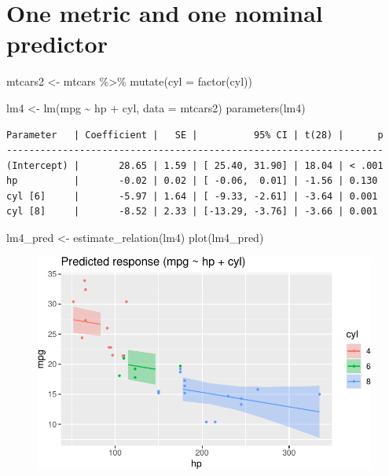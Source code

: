 \documentclass[
  letterpaper,
  DIV=11,
  numbers=noendperiod]{scrreprt}
\newenvironment{Shaded}{\begin{snugshade}}{\end{snugshade}}
\newcommand{\AttributeTok}[1]{\textcolor[rgb]{0.40,0.45,0.13}{#1}}
\newcommand{\FunctionTok}[1]{\textcolor[rgb]{0.28,0.35,0.67}{#1}}
\newcommand{\NormalTok}[1]{\textcolor[rgb]{0.00,0.23,0.31}{#1}}
\newcommand{\OtherTok}[1]{\textcolor[rgb]{0.00,0.23,0.31}{#1}}
\newcommand{\SpecialCharTok}[1]{\textcolor[rgb]{0.37,0.37,0.37}{#1}}
\theoremstyle{definition}
\theoremstyle{definition}
\theoremstyle{remark}
\begin{document}
\hypertarget{one-metric-and-one-nominal-predictor}{%
\section{One metric and one nominal
predictor}\label{one-metric-and-one-nominal-predictor}}

\begin{Shaded}
\begin{Highlighting}[]
\NormalTok{mtcars2 }\OtherTok{\textless{}{-}}
\NormalTok{  mtcars }\SpecialCharTok{\%\textgreater{}\%} 
  \FunctionTok{mutate}\NormalTok{(}\AttributeTok{cyl =} \FunctionTok{factor}\NormalTok{(cyl))}

\NormalTok{lm4 }\OtherTok{\textless{}{-}} \FunctionTok{lm}\NormalTok{(mpg }\SpecialCharTok{\textasciitilde{}}\NormalTok{ hp }\SpecialCharTok{+}\NormalTok{ cyl, }\AttributeTok{data =}\NormalTok{ mtcars2)}
\FunctionTok{parameters}\NormalTok{(lm4)}
\end{Highlighting}
\end{Shaded}

\begin{verbatim}
Parameter   | Coefficient |   SE |          95% CI | t(28) |      p
-------------------------------------------------------------------
(Intercept) |       28.65 | 1.59 | [ 25.40, 31.90] | 18.04 | < .001
hp          |       -0.02 | 0.02 | [ -0.06,  0.01] | -1.56 | 0.130 
cyl [6]     |       -5.97 | 1.64 | [ -9.33, -2.61] | -3.64 | 0.001 
cyl [8]     |       -8.52 | 2.33 | [-13.29, -3.76] | -3.66 | 0.001 
\end{verbatim}

\begin{Shaded}
\begin{Highlighting}[]
\NormalTok{lm4\_pred }\OtherTok{\textless{}{-}} \FunctionTok{estimate\_relation}\NormalTok{(lm4)}
\FunctionTok{plot}\NormalTok{(lm4\_pred)}
\end{Highlighting}
\end{Shaded}

\begin{figure}[H]

{\centering \includegraphics{./regression1_files/figure-pdf/lm4-pred-1.pdf}

}

\end{figure}
\end{document}
